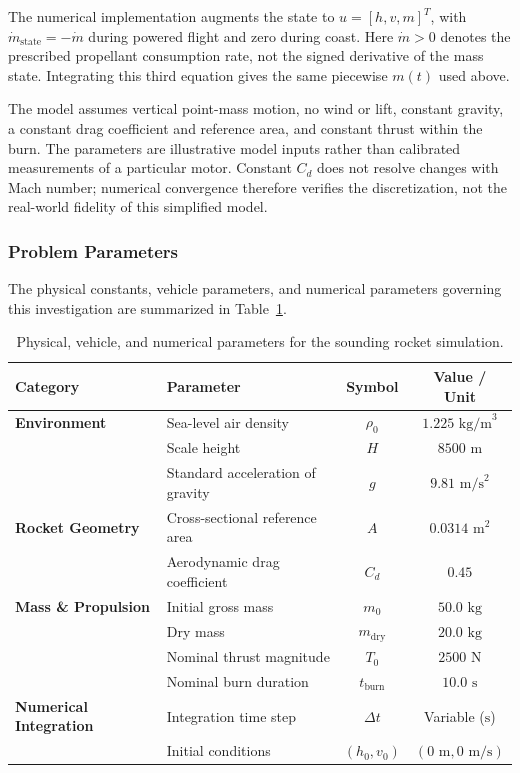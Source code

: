 \documentclass{article}
\begin{document}
The numerical implementation augments the state to $u=[h,v,m]^T$, with $\dot m_{\mathrm{state}}=-\dot m$ during powered flight and zero during coast. Here $\dot m>0$ denotes the prescribed propellant consumption rate, not the signed derivative of the mass state. Integrating this third equation gives the same piecewise $m(t)$ used above.

The model assumes vertical point-mass motion, no wind or lift, constant gravity, a constant drag coefficient and reference area, and constant thrust within the burn. The parameters are illustrative model inputs rather than calibrated measurements of a particular motor. Constant $C_d$ does not resolve changes with Mach number; numerical convergence therefore verifies the discretization, not the real-world fidelity of this simplified model.

\subsubsection{Problem Parameters}
The physical constants, vehicle parameters, and numerical parameters governing this investigation are summarized in Table~\ref{tab:parameters}.

\begin{table}[htbp]
\centering
\caption{Physical, vehicle, and numerical parameters for the sounding rocket simulation.}
\label{tab:parameters}
\begin{tabular}{llcc}
\hline
\textbf{Category} & \textbf{Parameter} & \textbf{Symbol} & \textbf{Value / Unit} \\ \hline
\textbf{Environment} & Sea-level air density & $\rho_0$ & $1.225\text{ kg/m}^3$ \\
 & Scale height & $H$ & $8500\text{ m}$ \\
 & Standard acceleration of gravity & $g$ & $9.81\text{ m/s}^2$ \\ \hline
\textbf{Rocket Geometry} & Cross-sectional reference area & $A$ & $0.0314\text{ m}^2$ \\
 & Aerodynamic drag coefficient & $C_d$ & $0.45$ \\ \hline
\textbf{Mass \& Propulsion} & Initial gross mass & $m_0$ & $50.0\text{ kg}$ \\
 & Dry mass & $m_{\text{dry}}$ & $20.0\text{ kg}$ \\
 & Nominal thrust magnitude & $T_0$ & $2500\text{ N}$ \\
 & Nominal burn duration & $t_{\text{burn}}$ & $10.0\text{ s}$ \\ \hline
\textbf{Numerical Integration} & Integration time step & $\Delta t$ & Variable ($\text{s}$) \\
 & Initial conditions & $(h_0, v_0)$ & $(0\text{ m}, 0\text{ m/s})$ \\ \hline
\end{tabular}
\end{table}
\end{document}
